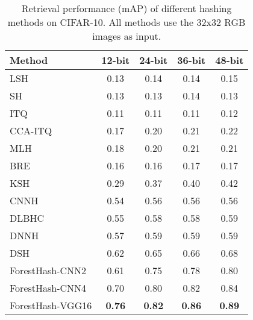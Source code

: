 \documentclass[runningheads]{llncs}
\begin{document}
\begin{table}
  \begin{center}
    \scriptsize
    \setlength{\tabcolsep}{4pt}
    \begin{tabular}{l|cccc}
      \hline
      Method             & 12-bit    & 24-bit      & 36-bit    & 48-bit     \\ 
      \hline %
      \hline %
      LSH \cite{LSH}     & 0.13      & 0.14        & 0.14      & 0.15       \\
      SH \cite{SH}       & 0.13      & 0.13        & 0.14      & 0.13       \\
      ITQ \cite{ITQ}     & 0.11      & 0.11        & 0.11      & 0.12       \\
      CCA-ITQ \cite{ITQ} & 0.17      & 0.20        & 0.21      & 0.22       \\  
      MLH \cite{MLH}     & 0.18      & 0.20        & 0.21      & 0.21       \\  
      BRE \cite{BRE}     & 0.16      & 0.16        & 0.17      & 0.17       \\  
      KSH \cite{KSH}     & 0.29      & 0.37        & 0.40      & 0.42       \\  
      CNNH \cite{CNNH}   & 0.54      & 0.56        & 0.56      & 0.56       \\  
      DLBHC \cite{DLBHC} & 0.55      & 0.58        & 0.58      & 0.59       \\  
      DNNH \cite{DNNH}   & 0.57      & 0.59        & 0.59      & 0.59       \\  
      DSH \cite{DSH}     & 0.62      & 0.65        & 0.66      & 0.68       \\ 
      \hline %
      ForestHash-CNN2    & 0.61      & 0.75        & 0.78      & 0.80       \\ 
      ForestHash-CNN4    & 0.70      & 0.80        & 0.82      & 0.84       \\
      ForestHash-VGG16   & \bf{0.76} & \bf{0.82}   & \bf{0.86} & \bf{0.89}  \\        
      \hline               
    \end{tabular}
  \end{center}
  \caption{Retrieval performance (mAP) of different hashing methods on
    CIFAR-10. All methods use the 32x32 RGB images as input. }
  \label{tab:CIFAR-hash-50k}
  \vspace{-1em}
\end{table}  
      
\end{document}
